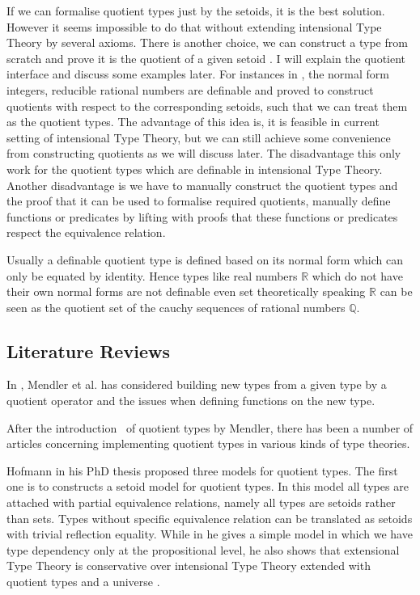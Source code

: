 \documentclass[envcountsame]{llncs}
\newcommand{\Q}{\mathbb{Q}}
\newcommand{\R}{\mathbb{R}}
\newcommand{\itt}{intensional Type Theory}
\begin{document}
If we can formalise quotient types just by the setoids, it is the best solution. However it seems impossible to do that without extending \itt{} by several axioms. There is another choice, we can construct a type from scratch and prove it is the quotient of a given setoid \cite{aan}.
I will explain the quotient interface and discuss some examples later. For instances in \cite{nuo:10}, the normal form integers,  reducible rational numbers are definable and proved to construct quotients with respect to the corresponding setoids,  such that we can treat them as the quotient types.
The advantage of this idea is, it is feasible in current setting of  intensional Type Theory,  but we can still achieve some convenience from constructing quotients as we will discuss later. The disadvantage this only work for the quotient types which are definable in \itt{}. Another disadvantage is we have to manually construct  the quotient types and the proof that it can be used to formalise required quotients,  manually define functions or predicates by lifting with proofs that these functions or predicates respect the equivalence relation\cite{hof:95:sm}.


Usually a definable quotient type is defined based on its normal form which can only be equated by identity. Hence types like real numbers $\R$ which do not have their own normal forms are not definable even set theoretically speaking  $\R$  can be seen as the  quotient set of the cauchy sequences of rational numbers  $\Q$. 


\subsection{Literature Reviews}

In \cite{cab}, Mendler et al. has considered building new types from a given type by  a quotient operator and the issues when defining functions on the new type.

 After the introduction~\cite{men} of quotient types by Mendler, there has been a number of articles concerning implementing quotient types in various kinds of type theories.


Hofmann in his PhD thesis \cite{hof:phd} proposed three models for quotient types. The first one is to constructs a setoid model for quotient types. In this model all types are attached with partial equivalence relations, namely all types are setoids rather than sets. Types without specific equivalence relation can be translated as setoids with trivial reflection equality. While in \cite{hof:95:sm} he gives a simple model in which we have type dependency only at the propositional level, he also shows that extensional Type Theory is conservative over \itt {}  extended with quotient types and a universe \cite{hof:95:con}.
\end{document}
